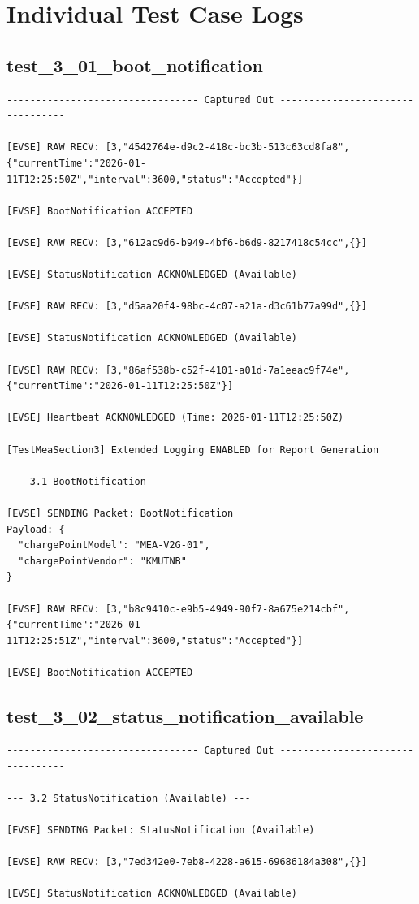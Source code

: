\documentclass{article}
\begin{document}
\section{Individual Test Case Logs}\subsection*{test\_3\_01\_boot\_notification}
\begin{lstlisting}
--------------------------------- Captured Out ---------------------------------

[EVSE] RAW RECV: [3,"4542764e-d9c2-418c-bc3b-513c63cd8fa8",{"currentTime":"2026-01-11T12:25:50Z","interval":3600,"status":"Accepted"}]

[EVSE] BootNotification ACCEPTED

[EVSE] RAW RECV: [3,"612ac9d6-b949-4bf6-b6d9-8217418c54cc",{}]

[EVSE] StatusNotification ACKNOWLEDGED (Available)

[EVSE] RAW RECV: [3,"d5aa20f4-98bc-4c07-a21a-d3c61b77a99d",{}]

[EVSE] StatusNotification ACKNOWLEDGED (Available)

[EVSE] RAW RECV: [3,"86af538b-c52f-4101-a01d-7a1eeac9f74e",{"currentTime":"2026-01-11T12:25:50Z"}]

[EVSE] Heartbeat ACKNOWLEDGED (Time: 2026-01-11T12:25:50Z)

[TestMeaSection3] Extended Logging ENABLED for Report Generation

--- 3.1 BootNotification ---

[EVSE] SENDING Packet: BootNotification
Payload: {
  "chargePointModel": "MEA-V2G-01",
  "chargePointVendor": "KMUTNB"
}

[EVSE] RAW RECV: [3,"b8c9410c-e9b5-4949-90f7-8a675e214cbf",{"currentTime":"2026-01-11T12:25:51Z","interval":3600,"status":"Accepted"}]

[EVSE] BootNotification ACCEPTED
\end{lstlisting}
\subsection*{test\_3\_02\_status\_notification\_available}
\begin{lstlisting}
--------------------------------- Captured Out ---------------------------------

--- 3.2 StatusNotification (Available) ---

[EVSE] SENDING Packet: StatusNotification (Available)

[EVSE] RAW RECV: [3,"7ed342e0-7eb8-4228-a615-69686184a308",{}]

[EVSE] StatusNotification ACKNOWLEDGED (Available)
\end{lstlisting}
\end{document}
